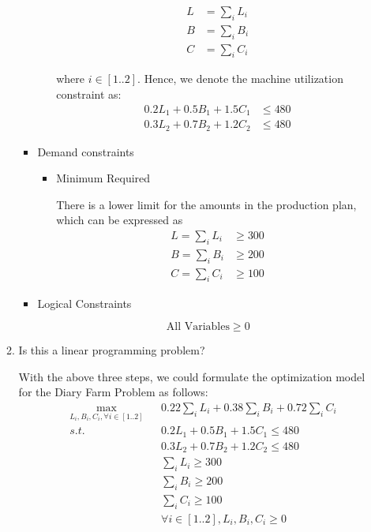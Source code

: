 \documentclass[11pt]{article}
\begin{document}
\begin{enumerate}
\begin{enumerate}
\begin{itemize}
\begin{itemize}
            \begin{align*}
                L &= \sum_i L_i \\
                B &= \sum_i B_i \\
                C &= \sum_i C_i
            \end{align*}
            
            where $i\in [1..2]$. Hence, we denote the machine utilization constraint as:
            \begin{align*}
                0.2 L_1 + 0.5 B_1 + 1.5 C_1 & \leq 480 \\
                0.3 L_2 + 0.7 B_2 + 1.2 C_2 & \leq 480
            \end{align*}
        \end{itemize}
        \item Demand constraints\par
        \begin{itemize}
            \item Minimum Required\par
            There is a lower limit for the amounts in the production plan, which can be expressed as
            \begin{align*}
                L = \sum_i L_i & \geq 300 \\
                B = \sum_i B_i & \geq 200 \\
                C = \sum_i C_i & \geq 100
            \end{align*}
        \end{itemize}
        
        \item Logical Constraints\par
        $$
        \text{All Variables} \geq 0
        $$
    \end{itemize}
    
    \item Is this a linear programming problem?\par
    With the above three steps, we could formulate the optimization model for the Diary Farm Problem as follows:
    \begin{align*}
        &\max_{L_i, B_i, C_i, \forall i \in [1..2]}&&0.22\sum_i L_i + 0.38\sum_i B_i + 0.72\sum_i C_i  \\
        &s.t.&&0.2 L_1 +        0.5 B_1 +       1.5 C_1  \leq 480 \\
        &    && 0.3 L_2 +     0.7 B_2  +       1.2 C_2  \leq 480 \\
        &    && \sum_i L_i  \geq 300 \\
        &   && \sum_i B_i  \geq 200 \\
        &   && \sum_i C_i \geq 100 \\
        &   && \forall i \in [1..2], L_i, B_i, C_i \geq 0
    \end{align*}
    

\end{enumerate}
\end{enumerate}
\end{document}
